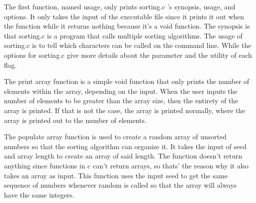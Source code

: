\documentclass[11pt]{article} %
\begin{document}
\begin{flushleft}
The first function, named usage,  only prints sorting.c 's synopsis, usage, and options. It only takes the input of the executable file since it prints it out when the function while it returns nothing because it's a void function. The synopsis is that sorting.c is a program that calls multiple sorting algorithms. The usage of sorting.c is to tell which characters can be called on the command line. While the options for sorting.c give more details about the parameter and the utility of each flag. 

The print array function is a simple void function that only prints the number of elements within the array, depending on the input. When the user inputs the number of elements to be greater than the array size, then the entirety of the array is printed. If that is not the case, the array is printed normally, where the array is printed out to the number of elements.

The populate array function is used to create a random array of unsorted numbers so that the sorting algorithm can organize it. It takes the input of seed and array length to create an array of said length. The function doesn't return anything since functions in c can't return arrays, so thats' the reason why it also takes an array as input. This function uses the input seed to get the same sequence of numbers whenever random is called so that the array will always have the same integers.


\end{flushleft}
\end{document}
